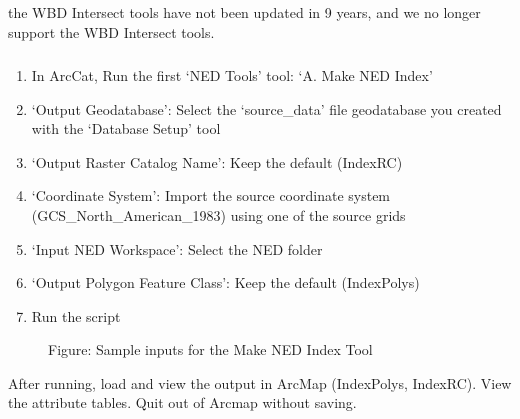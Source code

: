 \documentclass[letterpaper,10pt,english]{sphinxmanual}
\begin{document}
\subparagraph{}
\label{\detokenize{ex_1:step-1c-wbd-intersect-tools}}
 the WBD Intersect tools have not been updated in 9 years, and we no longer support the WBD Intersect tools.


\paragraph{}
\label{\detokenize{ex_1:step-2-ned-tools}}

\subparagraph{}
\label{\detokenize{ex_1:step-2a-make-ned-index}}\begin{enumerate}
\def\theenumi{\arabic{enumi}}
\def\labelenumi{\theenumi .}
\makeatletter\def\p@enumii{\p@enumi \theenumi .}\makeatother
\item {} 
In ArcCat, Run the first ‘NED Tools’ tool: ‘A. Make NED Index’

\item {} 
‘Output Geodatabase’:  Select the ‘source\_data’ file geodatabase you created with the ‘Database Setup’ tool

\item {} 
‘Output Raster Catalog Name’: Keep the default (IndexRC)

\item {} 
‘Coordinate System’: Import the source coordinate system (GCS\_North\_American\_1983) using one of the source grids

\item {} 
‘Input NED Workspace’: Select the NED folder

\item {} 
‘Output Polygon Feature Class’: Keep the default (IndexPolys)

\item {} 
Run the script

\end{enumerate}

\begin{figure}[htbp]
\centering
\capstart

\noindent{}
\caption{Figure: Sample inputs for the Make NED Index Tool}\label{\detokenize{ex_1:id8}}\end{figure}

After running, load and view the output in ArcMap (IndexPolys, IndexRC).  View the attribute tables.  Quit out of Arcmap without saving.
\end{document}
